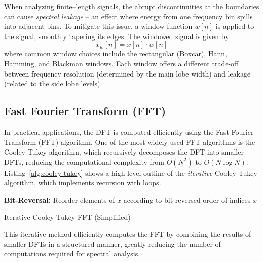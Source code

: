 \documentclass[12pt,letter]{article}
\begin{document}
When analyzing finite--length signals, the abrupt discontinuities at the
boundaries can cause \textit{spectral leakage} -- an effect where energy from
one frequency bin spills into adjacent bins. To mitigate this issue, a window
function $w[n]$ is applied to the signal, smoothly tapering its edges. The
windowed signal is given by:
\begin{equation}
x_w[n] = x[n] \cdot w[n]
\label{eqn:window}
\end{equation}
where common window choices include the rectangular (Boxcar), Hann, Hamming,
and Blackman windows. Each window offers a different trade-off between
frequency resolution (determined by the main lobe width) and leakage (related
to the side lobe levels).

\subsection{Fast Fourier Transform (FFT)}

In practical applications, the DFT is computed efficiently using the Fast
Fourier Transform (FFT) algorithm. One of the most widely used FFT algorithms
is the Cooley-Tukey algorithm, which recursively decomposes the DFT into
smaller DFTs, reducing the computational complexity from $O(N^2)$ to
$O(N \log N)$. Listing~\ref{alg:cooley-tukey} shows a high-level outline of
the \textit{iterative} Cooley-Tukey algorithm, which implements recursion
with loops.

\begin{algorithm}[H]
\SetAlgoLined
{}
\textbf{Bit-Reversal:} Reorder elements of $x$ according to bit-reversed order of indices\;
\Return $x$\;
\caption{Iterative Cooley-Tukey FFT (Simplified)}
\label{alg:cooley-tukey}
\end{algorithm}

This iterative method efficiently computes the FFT by combining the results
of smaller DFTs in a structured manner, greatly reducing the number of
computations required for spectral analysis.
\end{document}
